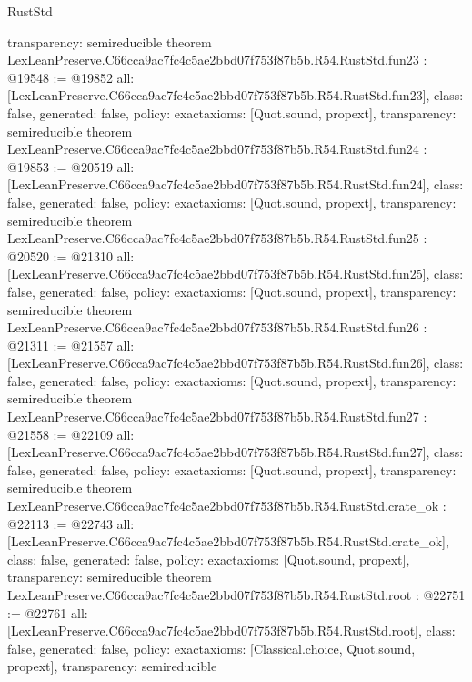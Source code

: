 \begin{lexlean}{RustStd}
\begin{coremodule}
{  transparency: semireducible
}
theorem LexLeanPreserve.C66cca9ac7fc4c5ae2bbd07f753f87b5b.R54.RustStd.fun23 : @19548 := @19852 {
  all: [LexLeanPreserve.C66cca9ac7fc4c5ae2bbd07f753f87b5b.R54.RustStd.fun23],
  class: false,
  generated: false,
  policy: exact{axioms: [Quot.sound, propext]},
  transparency: semireducible
}
theorem LexLeanPreserve.C66cca9ac7fc4c5ae2bbd07f753f87b5b.R54.RustStd.fun24 : @19853 := @20519 {
  all: [LexLeanPreserve.C66cca9ac7fc4c5ae2bbd07f753f87b5b.R54.RustStd.fun24],
  class: false,
  generated: false,
  policy: exact{axioms: [Quot.sound, propext]},
  transparency: semireducible
}
theorem LexLeanPreserve.C66cca9ac7fc4c5ae2bbd07f753f87b5b.R54.RustStd.fun25 : @20520 := @21310 {
  all: [LexLeanPreserve.C66cca9ac7fc4c5ae2bbd07f753f87b5b.R54.RustStd.fun25],
  class: false,
  generated: false,
  policy: exact{axioms: [Quot.sound, propext]},
  transparency: semireducible
}
theorem LexLeanPreserve.C66cca9ac7fc4c5ae2bbd07f753f87b5b.R54.RustStd.fun26 : @21311 := @21557 {
  all: [LexLeanPreserve.C66cca9ac7fc4c5ae2bbd07f753f87b5b.R54.RustStd.fun26],
  class: false,
  generated: false,
  policy: exact{axioms: [Quot.sound, propext]},
  transparency: semireducible
}
theorem LexLeanPreserve.C66cca9ac7fc4c5ae2bbd07f753f87b5b.R54.RustStd.fun27 : @21558 := @22109 {
  all: [LexLeanPreserve.C66cca9ac7fc4c5ae2bbd07f753f87b5b.R54.RustStd.fun27],
  class: false,
  generated: false,
  policy: exact{axioms: [Quot.sound, propext]},
  transparency: semireducible
}
theorem LexLeanPreserve.C66cca9ac7fc4c5ae2bbd07f753f87b5b.R54.RustStd.crate_ok : @22113 := @22743 {
  all: [LexLeanPreserve.C66cca9ac7fc4c5ae2bbd07f753f87b5b.R54.RustStd.crate_ok],
  class: false,
  generated: false,
  policy: exact{axioms: [Quot.sound, propext]},
  transparency: semireducible
}
theorem LexLeanPreserve.C66cca9ac7fc4c5ae2bbd07f753f87b5b.R54.RustStd.root : @22751 := @22761 {
  all: [LexLeanPreserve.C66cca9ac7fc4c5ae2bbd07f753f87b5b.R54.RustStd.root],
  class: false,
  generated: false,
  policy: exact{axioms: [Classical.choice, Quot.sound, propext]},
  transparency: semireducible
}


\end{coremodule}
\end{lexlean}
